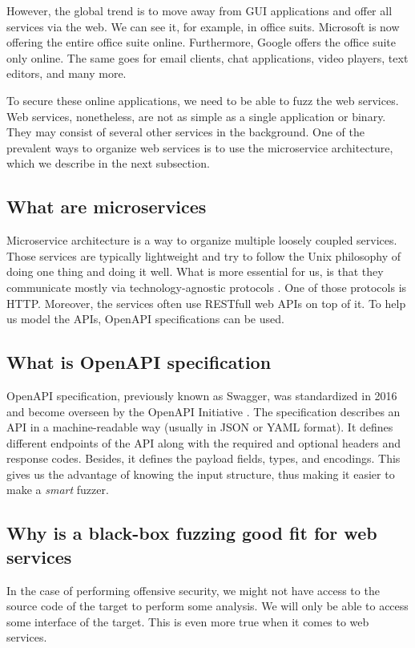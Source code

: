 However, the global trend is to move away from GUI applications and offer all services via the web. We can see it, for example, in office suits. Microsoft is now offering the entire office suite online. Furthermore, Google offers the office suite only online. The same goes for email clients, chat applications, video players, text editors, and many more.

To secure these online applications, we need to be able to fuzz the web services. Web services, nonetheless, are not as simple as a single application or binary. They may consist of several other services in the background. One of the prevalent ways to organize web services is to use the microservice architecture, which we describe in the next subsection.

\subsection{What are microservices}
Microservice architecture is a way to organize multiple loosely coupled services. Those services are typically lightweight and try to follow the Unix philosophy of doing one thing and doing it well. What is more essential for us, is that they communicate mostly via technology-agnostic protocols \cite{nadareishvili2016microservice}. One of those protocols is HTTP. Moreover, the services often use RESTfull web APIs on top of it. To help us model the APIs, OpenAPI specifications can be used.

\subsection{What is OpenAPI specification}
OpenAPI specification, previously known as Swagger, was standardized in 2016 and become overseen by the OpenAPI Initiative \cite{openapi2020main}. The specification describes an API in a machine-readable way (usually in JSON or YAML format). It defines different endpoints of the API along with the required and optional headers and response codes. Besides, it defines the payload fields, types, and encodings. This gives us the advantage of knowing the input structure, thus making it easier to make a \emph{smart} fuzzer.

\subsection{Why is a black-box fuzzing good fit for web services}
In the case of performing offensive security, we might not have access to the source code of the target to perform some analysis. We will only be able to access some interface of the target. This is even more true when it comes to web services.
